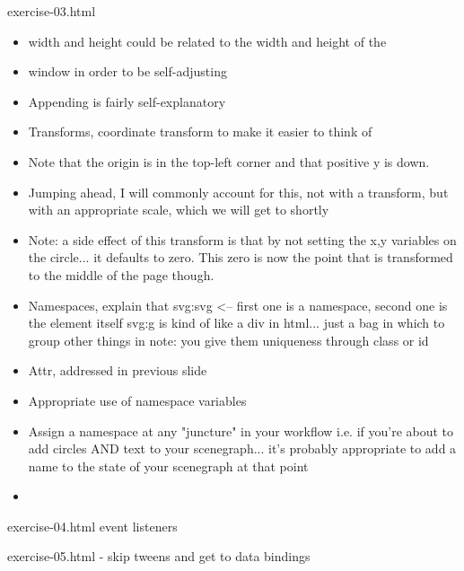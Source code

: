 \documentclass{beamer}
\begin{document}
\begin{frame}
\begin{frame}
\begin{block}{exercise-03.html}
\begin{itemize}
\begin{itemize}
                \item width and height could be related to the width and height of the 
                \item window in order to be self-adjusting
                \pause
                \item Appending is fairly self-explanatory
                \pause
                \item Transforms, coordinate transform to make it easier to think of
                \item Note that the origin is in the top-left corner and that positive y
                      is down.
                \item Jumping ahead, I will commonly account for this, not with a transform, but
                        with an appropriate scale, which we will get to shortly
                \item Note: a side effect of this transform is that by not setting the x,y variables
                        on the circle... it defaults to zero.  This zero is now the point that is
                        transformed to the middle of the page though.
                \pause
                \item Namespaces, explain that svg:svg <-- first one is a namespace, second
                one is the element itself
                svg:g is kind of like a div in html... just a bag in which to group other things
                in
                note: you give them uniqueness through class or id
                \pause
                \item Attr, addressed in previous slide
                \pause
                \item Appropriate use of namespace variables
                \item Assign a namespace at any "juncture" in your workflow
                    i.e. if you're about to add circles AND text to your scenegraph... it's
                        probably appropriate to add a name to the state of your scenegraph at
                        that point
                \pause
                \item 
            \end{itemize}
        \end{itemize}
    \end{block}
\end{frame}

exercise-04.html
event listeners

exercise-05.html
- skip tweens and get to data bindings


\end{frame}
\end{document}
